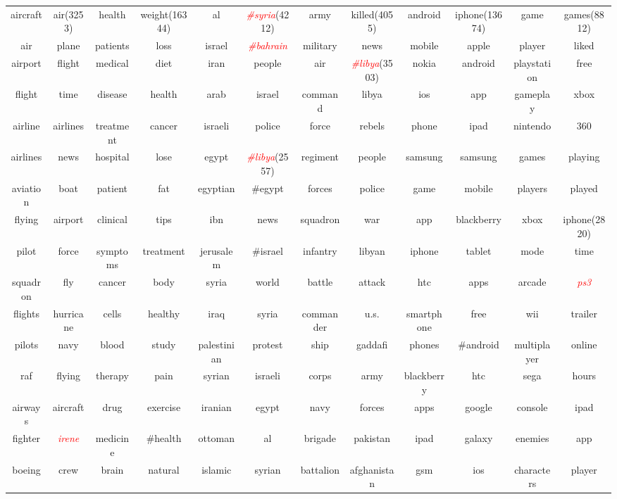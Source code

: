\documentclass[11pt]{article}
\begin{document}
\begin{table}[ht]
{\begin{tabular}{|cc|cc|cc|cc|cc|cc|}
\hline
aircraft & air\scriptsize(3253) & health & weight\scriptsize(16344) & al & \textcolor{red}{\textit{\#syria}}\scriptsize(4212) & army & killed\scriptsize(4055)  & android & iphone\scriptsize (13674) & game & games\scriptsize(8812) \\ 
air & plane & patients & loss & israel & \textcolor{red}{\textit{\#bahrain}} & military & news & mobile & apple & player & liked \\ 
airport & flight & medical & diet & iran & people & air & \textcolor{red}{\textit{\#libya}}\scriptsize(3503) & nokia & android & playstation & free \\ 
flight & time & disease & health & arab & israel & command & libya & ios & app & gameplay & xbox \\
airline & airlines & treatment & cancer & israeli & police & force & rebels & phone & ipad & nintendo & 360 \\
airlines & news & hospital & lose & egypt & \textcolor{red}{\textit{\#libya}}\scriptsize(2557) & regiment & people & samsung & samsung & games & playing \\
aviation & boat & patient & fat & egyptian & \#egypt & forces & police & game & mobile & players & played \\
flying & airport & clinical & tips & ibn & news & squadron & war & app & blackberry & xbox &iphone\scriptsize(2820)\\
pilot & force & symptoms & treatment & jerusalem & \#israel & infantry & libyan & iphone & tablet & mode & time\\
squadron & fly & cancer & body & syria & world & battle & attack & htc & apps & arcade & \textcolor{red}{\textit{ps3}}\\
flights & hurricane & cells & healthy & iraq & syria & commander & u.s. & smartphone & free & wii & trailer\\
pilots & navy & blood & study & palestinian & protest & ship & gaddafi & phones & \#android & multiplayer & online\\
raf & flying & therapy & pain & syrian & israeli & corps & army & blackberry & htc & sega & hours\\
airways & aircraft & drug & exercise & iranian & egypt & navy & forces & apps & google & console & ipad\\
fighter & \textcolor{red}{\textit{irene}} & medicine & \#health & ottoman & al & brigade & pakistan & ipad & galaxy & enemies & app\\
boeing & crew & brain & natural & islamic & syrian & battalion & afghanistan & gsm & ios & characters & player\\

\end{tabular}}
\end{table}
\end{document}
